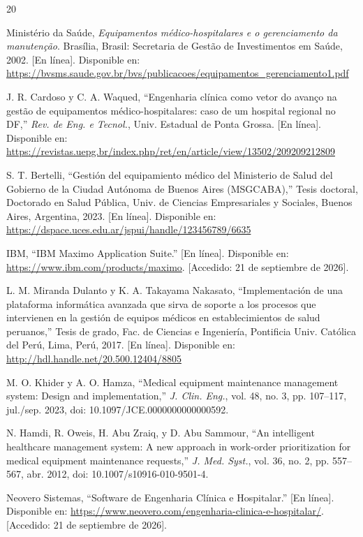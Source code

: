 \documentclass[10pt]{article}
\begin{document}
\begin{thebibliography}{20}

Ministério da Saúde, \emph{Equipamentos médico-hospitalares e o gerenciamento da manutenção}. Brasília, Brasil: Secretaria de Gestão de Investimentos em Saúde, 2002. [En línea]. Disponible en: \url{https://bvsms.saude.gov.br/bvs/publicacoes/equipamentos_gerenciamento1.pdf}

J. R. Cardoso y C. A. Waqued, “Engenharia clínica como vetor do avanço na gestão de equipamentos médico-hospitalares: caso de um hospital regional no DF,” \emph{Rev. de Eng. e Tecnol.}, Univ. Estadual de Ponta Grossa. [En línea]. Disponible en: \url{https://revistas.uepg.br/index.php/ret/en/article/view/13502/209209212809}

S. T. Bertelli, “Gestión del equipamiento médico del Ministerio de Salud del Gobierno de la Ciudad Autónoma de Buenos Aires (MSGCABA),” Tesis doctoral, Doctorado en Salud Pública, Univ. de Ciencias Empresariales y Sociales, Buenos Aires, Argentina, 2023. [En línea]. Disponible en: \url{https://dspace.uces.edu.ar/jspui/handle/123456789/6635}

IBM, “IBM Maximo Application Suite.” [En línea]. Disponible en: \url{https://www.ibm.com/products/maximo}. [Accedido: 21 de septiembre de 2026].

L. M. Miranda Dulanto y K. A. Takayama Nakasato, “Implementación de una plataforma informática avanzada que sirva de soporte a los procesos que intervienen en la gestión de equipos médicos en establecimientos de salud peruanos,” Tesis de grado, Fac. de Ciencias e Ingeniería, Pontificia Univ. Católica del Perú, Lima, Perú, 2017. [En línea]. Disponible en: \url{http://hdl.handle.net/20.500.12404/8805}

M. O. Khider y A. O. Hamza, “Medical equipment maintenance management system: Design and implementation,” \emph{J. Clin. Eng.}, vol. 48, no. 3, pp. 107--117, jul./sep. 2023, doi: 10.1097/JCE.0000000000000592.

N. Hamdi, R. Oweis, H. Abu Zraiq, y D. Abu Sammour, “An intelligent healthcare management system: A new approach in work-order prioritization for medical equipment maintenance requests,” \emph{J. Med. Syst.}, vol. 36, no. 2, pp. 557--567, abr. 2012, doi: 10.1007/s10916-010-9501-4.

Neovero Sistemas, “Software de Engenharia Clínica e Hospitalar.” [En línea]. Disponible en: \url{https://www.neovero.com/engenharia-clinica-e-hospitalar/}. [Accedido: 21 de septiembre de 2026].


\end{thebibliography}
\end{document}
